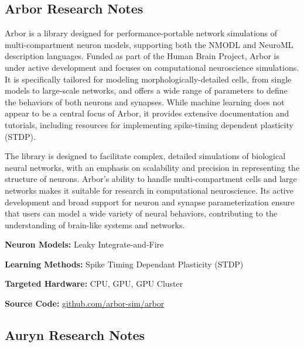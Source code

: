 \subsection*{Arbor Research Notes}\label{Arbor}

Arbor is a library designed for performance-portable network simulations of multi-compartment neuron models, supporting both the NMODL and NeuroML description languages. Funded as part of the Human Brain Project, Arbor is under active development and focuses on computational neuroscience simulations. It is specifically tailored for modeling morphologically-detailed cells, from single models to large-scale networks, and offers a wide range of parameters to define the behaviors of both neurons and synapses. While machine learning does not appear to be a central focus of Arbor, it provides extensive documentation and tutorials, including resources for implementing spike-timing dependent plasticity (STDP).

The library is designed to facilitate complex, detailed simulations of biological neural networks, with an emphasis on scalability and precision in representing the structure of neurons. Arbor’s ability to handle multi-compartment cells and large networks makes it suitable for research in computational neuroscience. Its active development and broad support for neuron and synapse parameterization ensure that users can model a wide variety of neural behaviors, contributing to the understanding of brain-like systems and networks.

\begin{tcolorbox}[enhanced,attach boxed title to top center={yshift=-3mm,yshifttext=-1mm}, colback=blue!5!white,colframe=blue!75!black,colbacktitle=red!80!black, title=Arbor at a Glance,fonttitle=\bfseries, boxed title style={size=small,colframe=red!50!black} ]

\textbf{Neuron Models:} Leaky Integrate-and-Fire

\textbf{Learning Methods:} Spike Timing Dependant Plasticity (STDP)  

\textbf{Targeted Hardware:} CPU, GPU, GPU Cluster 

\textbf{Source Code:} \href{https://github.com/arbor-sim/arbor}{github.com/arbor-sim/arbor}
\end{tcolorbox}
\subsection*{Auryn Research Notes}\label{Auryn}

